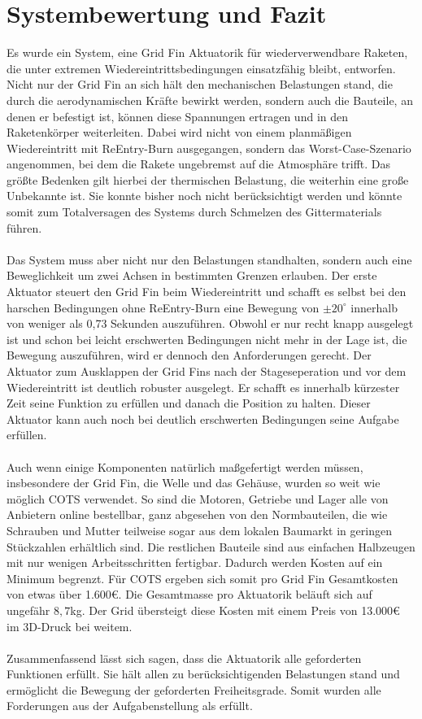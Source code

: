 \section{Systembewertung und Fazit}
Es wurde ein System, eine Grid Fin Aktuatorik für wiederverwendbare Raketen, die unter extremen Wiedereintrittsbedingungen einsatzfähig bleibt, entworfen. Nicht nur der Grid Fin an sich hält den mechanischen Belastungen stand, die durch die aerodynamischen Kräfte bewirkt werden, sondern auch die Bauteile, an denen er befestigt ist, können diese Spannungen ertragen und in den Raketenkörper weiterleiten. Dabei wird nicht von einem planmäßigen Wiedereintritt mit ReEntry-Burn ausgegangen, sondern das Worst-Case-Szenario angenommen, bei dem die Rakete ungebremst auf die Atmosphäre trifft. Das größte Bedenken gilt hierbei der thermischen Belastung, die weiterhin eine große Unbekannte ist. Sie konnte bisher noch nicht berücksichtigt werden und könnte somit zum Totalversagen des Systems durch Schmelzen des Gittermaterials führen.
\\~\\
Das System muss aber nicht nur den Belastungen standhalten, sondern auch eine Beweglichkeit um zwei Achsen in bestimmten Grenzen erlauben. Der erste Aktuator steuert den Grid Fin beim Wiedereintritt und schafft es selbst bei den harschen Bedingungen ohne ReEntry-Burn eine Bewegung von $\pm 20^\circ$  innerhalb von weniger als 0,73 Sekunden auszuführen. Obwohl er nur recht knapp ausgelegt ist und schon bei leicht erschwerten Bedingungen nicht mehr in der Lage ist, die Bewegung auszuführen, wird er dennoch den Anforderungen gerecht. Der Aktuator zum Ausklappen der Grid Fins nach der Stageseperation und vor dem Wiedereintritt ist deutlich robuster ausgelegt. Er schafft es innerhalb kürzester Zeit seine Funktion zu erfüllen und danach die Position zu halten. Dieser Aktuator kann auch noch bei deutlich erschwerten Bedingungen seine Aufgabe erfüllen.
\\~\\
Auch wenn einige Komponenten natürlich maßgefertigt werden müssen, insbesondere der Grid Fin, die Welle und das Gehäuse, wurden so weit wie möglich COTS verwendet. So sind die Motoren, Getriebe und Lager alle von Anbietern online bestellbar, ganz abgesehen von den Normbauteilen, die wie Schrauben und Mutter teilweise sogar aus dem lokalen Baumarkt in geringen Stückzahlen erhältlich sind. Die restlichen Bauteile sind aus einfachen Halbzeugen mit nur wenigen Arbeitsschritten fertigbar. Dadurch werden Kosten auf ein Minimum begrenzt. Für COTS ergeben sich somit pro Grid Fin Gesamtkosten von etwas über 1.600€. Die Gesamtmasse pro Aktuatorik beläuft sich auf ungefähr $8,7$kg. Der Grid übersteigt diese Kosten mit einem Preis von 13.000€ im 3D-Druck bei weitem.
\\~\\
Zusammenfassend lässt sich sagen, dass die Aktuatorik alle geforderten Funktionen erfüllt. Sie hält allen zu berücksichtigenden Belastungen stand und ermöglicht die Bewegung der geforderten Freiheitsgrade. Somit wurden alle Forderungen aus der Aufgabenstellung als erfüllt.
